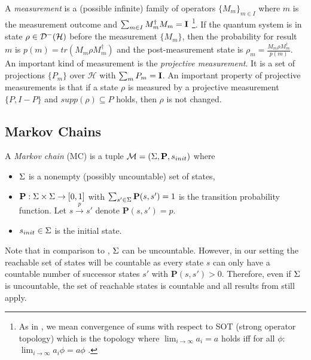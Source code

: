 \documentclass[a4paper,UKenglish,cleveref, autoref, thm-restate]{lipics-v2021}
\begin{document}
A \emph{measurement} is a (possible infinite) family of operators $\{M_m\}_{m\in I}$ where $m$ is the measurement outcome and $\sum_{m\in I} M_m^\dagger M_m = \textbf{I}$ \footnote[1]{As in \cite{heisenbergdualityUnruh}, we mean convergence of sums with respect to SOT (strong operator topology) which is the topology where $\lim_{i\to \infty} a_i = a$ holds iff for all $\phi$: $\lim_{i\to \infty} a_i \phi = a \phi$ \cite[Prop. IX.1.3(c)]{conway1994}.}.
If the quantum system is in state $\rho \in \mathcal{D}^- (\mathcal{H})$ before the measurement $\{M_m\}$, then the probability for result $m$ is $p(m)=tr( M_m \rho M^\dagger_m)$ and the post-measurement state is $\rho_m = \frac{M_m\rho M^\dagger_m}{p(m)}$.
An important kind of measurement is the \textit{projective measurement}. It is a set of projections $\{P_m\}$ over $\mathcal{H}$ with $\sum_m P_m =\textbf{I}$.
An important property of projective measurements is that if a state $\rho$ is measured by a projective measurement $\{P,I-P\}$ and $supp(\rho)\subseteq P$ holds, then $\rho$ is not changed.

\subsection{Markov Chains}

A \emph{Markov chain} (MC) is a tuple $\mathcal{M} = (\Sigma,\textbf{P},s_{init})$ where
    \begin{itemize}
        \item $\Sigma$ is a nonempty (possibly uncountable) set of states,
        \item $\textbf{P}:\Sigma \times \Sigma \rightarrow [0,1]$ with $\sum_{s' \in \Sigma}\textbf{P}(s,s')=1$ is the transition probability function. Let $s \overset{p}{\rightarrow} s'$ denote $\textbf{P}(s,s')=p$.
        \item $s_{init}\in \Sigma$ is the initial state.
    \end{itemize}
Note that in comparison to \cite{mcBible,conditioningProb}, $\Sigma$ can be uncountable. However, in our setting the reachable set of states will be countable as every state $s$ can only have a countable number of successor states $s'$ with $\textbf{P}(s,s')>0$. Therefore, even if $\Sigma$ is uncountable, the set of reachable states is countable and all results from \cite{mcBible,conditioningProb} still apply.
\end{document}
